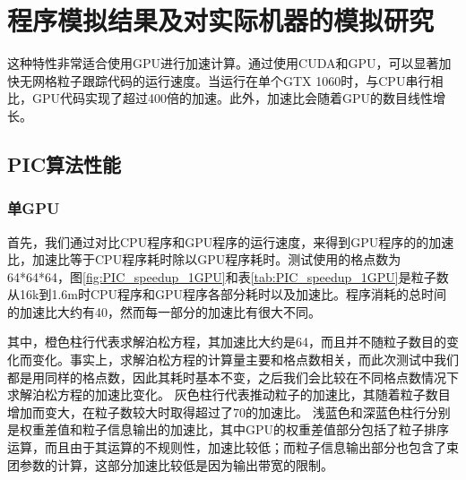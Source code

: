 \chapter{程序模拟结果及对实际机器的模拟研究}
\label{chap:Simulation}

这种特性非常适合使用GPU进行加速计算。通过使用CUDA和GPU，可以显著加快无网格粒子跟踪代码的运行速度。当运行在单个GTX 1060时，与CPU串行相比，GPU代码实现了超过400倍的加速。此外，加速比会随着GPU的数目线性增长。
\section{PIC算法性能}

\subsection{单GPU}
首先，我们通过对比CPU程序和GPU程序的运行速度，来得到GPU程序的的加速比，加速比等于CPU程序耗时除以GPU程序耗时。测试使用的格点数为64*64*64，图\ref{fig:PIC_speedup_1GPU}和表\ref{tab:PIC_speedup_1GPU}是粒子数从16k到1.6m时CPU程序和GPU程序各部分耗时以及加速比。程序消耗的总时间的加速比大约有40，然而每一部分的加速比有很大不同。

其中，橙色柱行代表求解泊松方程，其加速比大约是64，而且并不随粒子数目的变化而变化。事实上，求解泊松方程的计算量主要和格点数相关，而此次测试中我们都是用同样的格点数，因此其耗时基本不变，之后我们会比较在不同格点数情况下求解泊松方程的加速比变化。
灰色柱行代表推动粒子的加速比，其随着粒子数目增加而变大，在粒子数较大时取得超过了70的加速比。
浅蓝色和深蓝色柱行分别是权重差值和粒子信息输出的加速比，其中GPU的权重差值部分包括了粒子排序运算，而且由于其运算的不规则性，加速比较低；而粒子信息输出部分也包含了束团参数的计算，这部分加速比较低是因为输出带宽的限制。


